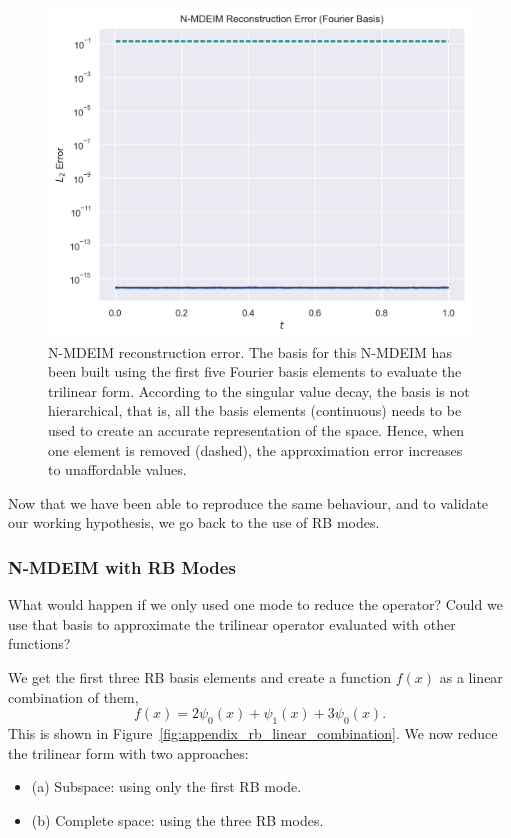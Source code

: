 \documentclass[../../thesis.tex]{subfiles}
\begin{document}
\begin{figure}[h]
    \includegraphics[width=\columnwidth]{research_project/piston/figures/svd_fourier/fourier_basis_mdeim_truncation_errors_comparison.png}
    \caption{N-MDEIM reconstruction error.
    The basis for this N-MDEIM has been built using 
    the first five Fourier basis elements to evaluate the trilinear form.
    According to the singular value decay, the basis is not hierarchical, 
    that is, all the basis elements (continuous) needs to be used to 
    create an accurate representation of the space.
    Hence, when one element is removed (dashed), 
    the approximation error increases to unaffordable values.}
    \label{fig:appendix_fourier_nmdeim_reconstruction_error}
\end{figure}
Now that we have been able to reproduce the same behaviour, 
and to validate our working hypothesis,
we go back to the use of RB modes.

\subsubsection{N-MDEIM with RB Modes}
\label{sec:nmdeim_one_mode}
What would happen if we only used one mode to reduce the operator?
Could we use that basis to approximate the trilinear operator evaluated with other functions?

We get the first three RB basis elements and create a function $f(x)$ as a linear combination of them,
\begin{equation}
    f(x) = 2 \psi_0(x) + \psi_1(x) + 3 \psi_0(x).
\end{equation} 
This is shown in Figure~\ref{fig:appendix_rb_linear_combination}.
We now reduce the trilinear form with two approaches:
\begin{itemize}
    \item (a) Subspace: using only the first RB mode.
    \item (b) Complete space: using the three RB modes.
\end{itemize}
\end{document}
